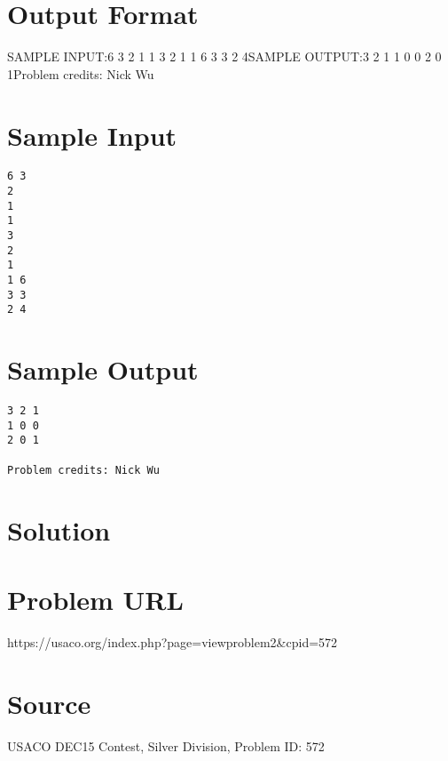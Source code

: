 \documentclass[12pt]{article}
\begin{document}
\section*{Output Format}
SAMPLE INPUT:6 3
2
1
1
3
2
1
1 6
3 3
2 4SAMPLE OUTPUT:3 2 1
1 0 0
2 0 1Problem credits: Nick Wu

\section*{Sample Input}
\begin{verbatim}
6 3
2
1
1
3
2
1
1 6
3 3
2 4
\end{verbatim}

\section*{Sample Output}
\begin{verbatim}
3 2 1
1 0 0
2 0 1

Problem credits: Nick Wu
\end{verbatim}

\section*{Solution}


\section*{Problem URL}
https://usaco.org/index.php?page=viewproblem2&cpid=572

\section*{Source}
USACO DEC15 Contest, Silver Division, Problem ID: 572
\end{document}
